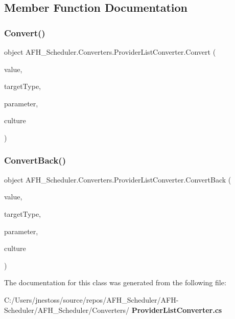 \subsection{Member Function Documentation}
\mbox{\label{class_a_f_h___scheduler_1_1_converters_1_1_provider_list_converter_ab7edc020f72e0ee2eeb2611eb8b956b7}} 
\subsubsection{Convert()}
{\footnotesize\ttfamily object A\+F\+H\+\_\+\+Scheduler.\+Converters.\+Provider\+List\+Converter.\+Convert (\begin{DoxyParamCaption}\item[{object}]{value,  }\item[{Type}]{target\+Type,  }\item[{object}]{parameter,  }\item[{Culture\+Info}]{culture }\end{DoxyParamCaption})}

\mbox{\label{class_a_f_h___scheduler_1_1_converters_1_1_provider_list_converter_a07888be55004b6e63ddf9adfe5dfe861}} 
\subsubsection{ConvertBack()}
{\footnotesize\ttfamily object A\+F\+H\+\_\+\+Scheduler.\+Converters.\+Provider\+List\+Converter.\+Convert\+Back (\begin{DoxyParamCaption}\item[{object}]{value,  }\item[{Type}]{target\+Type,  }\item[{object}]{parameter,  }\item[{Culture\+Info}]{culture }\end{DoxyParamCaption})}



The documentation for this class was generated from the following file\+:\begin{DoxyCompactItemize}
\item 
C\+:/\+Users/jnestoss/source/repos/\+A\+F\+H\+\_\+\+Scheduler/\+A\+F\+H-\/\+Scheduler/\+A\+F\+H\+\_\+\+Scheduler/\+Converters/\textbf{ Provider\+List\+Converter.\+cs}\end{DoxyCompactItemize}
